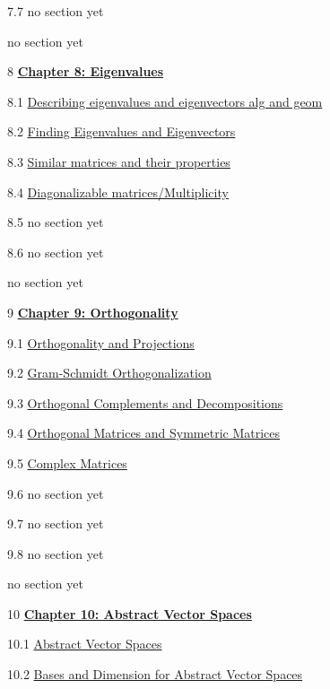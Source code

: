 \documentclass{ximera}
\begin{document}
7.7	no section yet
	
	no section yet
	
8	\href{https://ximera.osu.edu/oerlinalg/LinearAlgebra/XLAChapter_eigenvalues/main}{\textbf{Chapter 8: Eigenvalues}}
	
8.1	\href{https://ximera.osu.edu/oerlinalg/LinearAlgebra/EIG-0010/main}{Describing eigenvalues and eigenvectors alg and geom}
	
8.2	\href{https://ximera.osu.edu/oerlinalg/LinearAlgebra/EIG-0020/main}{Finding Eigenvalues and Eigenvectors}
	
8.3	\href{https://ximera.osu.edu/oerlinalg/LinearAlgebra/EIG-0040/main}{Similar matrices and their properties}
	
8.4	\href{https://ximera.osu.edu/oerlinalg/LinearAlgebra/EIG-0050/main}{Diagonalizable matrices/Multiplicity}
	
8.5	no section yet
	
8.6	no section yet
	
	no section yet
	
9	\href{https://ximera.osu.edu/oerlinalg/LinearAlgebra/XLAChapter_orthogonality/main}{\textbf{Chapter 9: Orthogonality}}
	
9.1	\href{https://ximera.osu.edu/oerlinalg/LinearAlgebra/RTH-0010/main}{Orthogonality and Projections}
	
9.2	\href{https://ximera.osu.edu/oerlinalg/LinearAlgebra/RTH-0015/main}{Gram-Schmidt Orthogonalization}
	
9.3	\href{https://ximera.osu.edu/oerlinalg/LinearAlgebra/RTH-0020/main}{Orthogonal Complements and Decompositions}
	
9.4	\href{https://ximera.osu.edu/oerlinalg/LinearAlgebra/RTH-0035/main}{Orthogonal Matrices and Symmetric Matrices}
	
9.5	\href{https://ximera.osu.edu/oerlinalg/LinearAlgebra/RTH-0050/main}{Complex Matrices}
	
9.6	no section yet
	
9.7	no section yet
	
9.8	no section yet
	
	no section yet
	
10	\href{https://ximera.osu.edu/oerlinalg/LinearAlgebra/XLAChapter_vecSpaces/main}{\textbf{Chapter 10: Abstract Vector Spaces}}
	
10.1	\href{https://ximera.osu.edu/oerlinalg/LinearAlgebra/VSP-0050/main}{Abstract Vector Spaces}
	
10.2	\href{https://ximera.osu.edu/oerlinalg/LinearAlgebra/VSP-0060/main}{Bases and Dimension for Abstract Vector Spaces}
	
\end{document}
